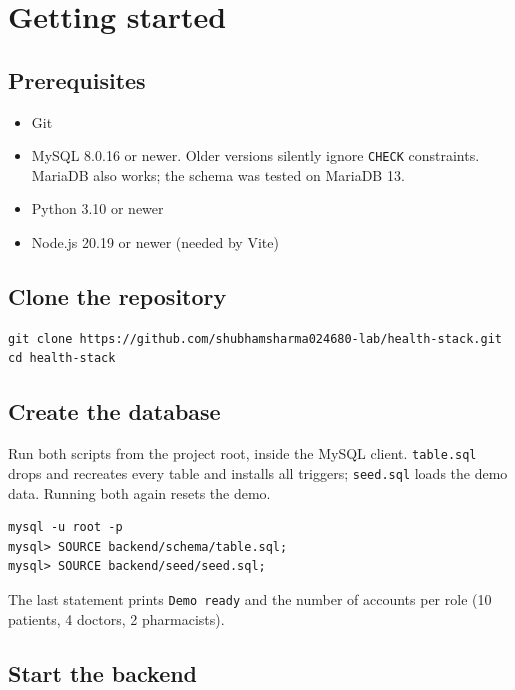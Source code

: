 \documentclass[11pt,a4paper]{article}
\newcommand{\code}[1]{\texttt{#1}}
\begin{document}
\section{Getting started}

\subsection{Prerequisites}

\begin{itemize}
  \item Git
  \item MySQL 8.0.16 or newer. Older versions silently ignore \code{CHECK} constraints. MariaDB also works; the schema was tested on MariaDB 13.
  \item Python 3.10 or newer
  \item Node.js 20.19 or newer (needed by Vite)
\end{itemize}

\subsection{Clone the repository}

\begin{lstlisting}[style=bash]
git clone https://github.com/shubhamsharma024680-lab/health-stack.git
cd health-stack
\end{lstlisting}

\subsection{Create the database}

Run both scripts from the project root, inside the MySQL client. \code{table.sql} drops and recreates every table and installs all triggers; \code{seed.sql} loads the demo data. Running both again resets the demo.

\begin{lstlisting}[style=bash]
mysql -u root -p
mysql> SOURCE backend/schema/table.sql;
mysql> SOURCE backend/seed/seed.sql;
\end{lstlisting}

The last statement prints \code{Demo ready} and the number of accounts per role (10 patients, 4 doctors, 2 pharmacists).

\subsection{Start the backend}
\end{document}
